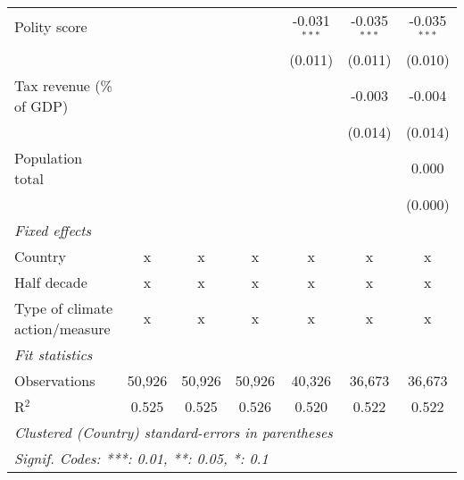 \begin{tabular}{lcccccc}
   Polity score                                                       &               &              &               & -0.031$^{***}$ & -0.035$^{***}$ & -0.035$^{***}$\\   
                                                                      &               &              &               & (0.011)        & (0.011)        & (0.010)\\   
   Tax revenue (\% of GDP)                                            &               &              &               &                & -0.003         & -0.004\\   
                                                                      &               &              &               &                & (0.014)        & (0.014)\\   
   Population total                                                   &               &              &               &                &                & 0.000\\   
                                                                      &               &              &               &                &                & (0.000)\\   
   \emph{Fixed effects}\\
   Country                                                            & x             & x            & x             & x              & x              & x\\  
   Half decade                                                        & x             & x            & x             & x              & x              & x\\  
   Type of climate action/measure                                     & x             & x            & x             & x              & x              & x\\  
   \midrule \emph{Fit statistics}\\
   Observations                                                       & 50,926        & 50,926       & 50,926        & 40,326         & 36,673         & 36,673\\  
   R$^2$                                                              & 0.525         & 0.525        & 0.526         & 0.520          & 0.522          & 0.522\\  
   \midrule
   \multicolumn{7}{l}{\emph{Clustered (Country) standard-errors in parentheses}}\\
   \multicolumn{7}{l}{\emph{Signif. Codes: ***: 0.01, **: 0.05, *: 0.1}}\\
\end{tabular}
\par\endgroup


